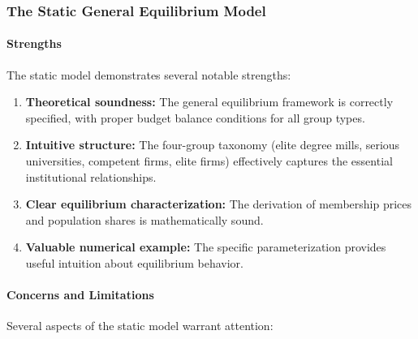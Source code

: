 \documentclass[12pt,letterpaper]{article}
\begin{document}
\subsubsection{The Static General Equilibrium Model}

\paragraph{Strengths}

The static model demonstrates several notable strengths:

\begin{enumerate}
	\item \textbf{Theoretical soundness:} The general equilibrium framework is correctly specified, with proper budget balance conditions for all group types.
	
	\item \textbf{Intuitive structure:} The four-group taxonomy (elite degree mills, serious universities, competent firms, elite firms) effectively captures the essential institutional relationships.
	
	\item \textbf{Clear equilibrium characterization:} The derivation of membership prices and population shares is mathematically sound.
	
	\item \textbf{Valuable numerical example:} The specific parameterization provides useful intuition about equilibrium behavior.
\end{enumerate}

\paragraph{Concerns and Limitations}

Several aspects of the static model warrant attention:
\end{document}
